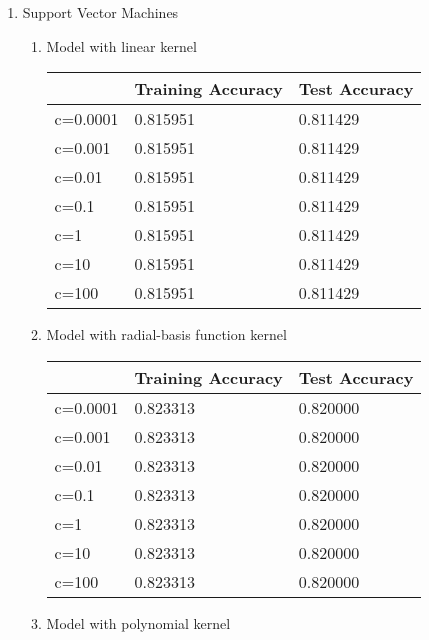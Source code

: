 \documentclass[12pt]{article}
\begin{document}
\begin{enumerate}
	\item Support Vector Machines
	\begin{enumerate}
		\item Model with linear kernel
		\begin{center}
			\begin{tabular}{|l|l|l|}
				\hline
				& Training Accuracy & Test Accuracy \\ \hline
				c=0.0001 & 0.815951          & 0.811429      \\ \hline
				c=0.001  & 0.815951          & 0.811429      \\ \hline
				c=0.01   & 0.815951          & 0.811429      \\ \hline
				c=0.1    & 0.815951          & 0.811429      \\ \hline
				c=1      & 0.815951          & 0.811429      \\ \hline
				c=10     & 0.815951          & 0.811429      \\ \hline
				c=100    & 0.815951          & 0.811429      \\ \hline
			\end{tabular}
		\end{center}
	
		\item Model with radial-basis function kernel
		
		\begin{center}
			\begin{tabular}{|l|l|l|}
				\hline
				& Training Accuracy & Test Accuracy \\ \hline
				c=0.0001 & 0.823313          & 0.820000      \\ \hline
				c=0.001  & 0.823313          & 0.820000      \\ \hline
				c=0.01   & 0.823313          & 0.820000      \\ \hline
				c=0.1    & 0.823313          & 0.820000      \\ \hline
				c=1      & 0.823313          & 0.820000      \\ \hline
				c=10     & 0.823313          & 0.820000      \\ \hline
				c=100    & 0.823313          & 0.820000      \\ \hline
			\end{tabular}
		\end{center}
	
		\item Model with polynomial kernel
		

\end{enumerate}
\end{enumerate}
\end{document}
